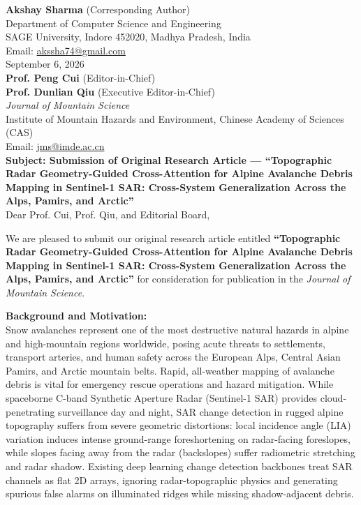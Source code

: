\documentclass[11pt,a4paper]{article}
\begin{document}
\sloppy

\noindent
\textbf{Akshay Sharma} (Corresponding Author) \\
Department of Computer Science and Engineering \\
SAGE University, Indore 452020, Madhya Pradesh, India \\
Email: \href{mailto:akssha74@gmail.com}{akssha74@gmail.com} \\[1.5em]

\noindent
September 6, 2026 \\[1em]

\noindent
\textbf{Prof. Peng Cui} (Editor-in-Chief) \\
\textbf{Prof. Dunlian Qiu} (Executive Editor-in-Chief) \\
\textit{Journal of Mountain Science} \\
Institute of Mountain Hazards and Environment, Chinese Academy of Sciences (CAS) \\
Email: \href{mailto:jms@imde.ac.cn}{jms@imde.ac.cn} \\[1.5em]

\noindent
\textbf{Subject: Submission of Original Research Article --- ``Topographic Radar Geometry-Guided Cross-Attention for Alpine Avalanche Debris Mapping in Sentinel-1 SAR: Cross-System Generalization Across the Alps, Pamirs, and Arctic''} \\[1em]

\noindent
Dear Prof. Cui, Prof. Qiu, and Editorial Board,

\medskip
\noindent
We are pleased to submit our original research article entitled \textbf{``Topographic Radar Geometry-Guided Cross-Attention for Alpine Avalanche Debris Mapping in Sentinel-1 SAR: Cross-System Generalization Across the Alps, Pamirs, and Arctic''} for consideration for publication in the \textit{Journal of Mountain Science}.

\medskip
\noindent
\textbf{Background and Motivation:} \\
Snow avalanches represent one of the most destructive natural hazards in alpine and high-mountain regions worldwide, posing acute threats to settlements, transport arteries, and human safety across the European Alps, Central Asian Pamirs, and Arctic mountain belts. Rapid, all-weather mapping of avalanche debris is vital for emergency rescue operations and hazard mitigation. While spaceborne C-band Synthetic Aperture Radar (Sentinel-1 SAR) provides cloud-penetrating surveillance day and night, SAR change detection in rugged alpine topography suffers from severe geometric distortions: local incidence angle (LIA) variation induces intense ground-range foreshortening on radar-facing foreslopes, while slopes facing away from the radar (backslopes) suffer radiometric stretching and radar shadow. Existing deep learning change detection backbones treat SAR channels as flat 2D arrays, ignoring radar-topographic physics and generating spurious false alarms on illuminated ridges while missing shadow-adjacent debris.
\end{document}

